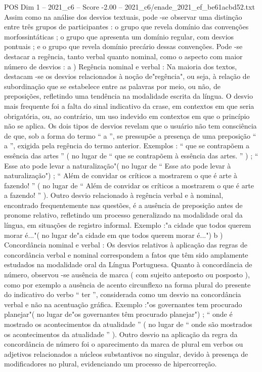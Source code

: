 \begin{textsample}{POS Dim 1 – 2021\_c6 – Score -2.00 – 2021\_c6/enade\_2021\_ef\_be61acbd52.txt}
Assim como na análise dos desvios textuais, pode -se observar uma distinção entre três grupos de participantes : o grupo que revela domínio das convenções morfossintáticas ; o grupo que apresenta um domínio regular, com desvios pontuais ; e o grupo que revela domínio precário dessas convenções.
Pode -se destacar a regência, tanto verbal quanto nominal, como o aspecto com maior número de desvios : a ) Regência nominal e verbal : Na maioria dos textos, destacam -se os desvios relacionados à noção de"regência", ou seja, à relação de subordinação que se estabelece entre as palavras por meio, ou não, de preposições, refletindo uma tendência na modalidade escrita da língua.
O desvio mais frequente foi a falta do sinal indicativo da crase, em contextos em que seria obrigatória, ou, ao contrário, um uso indevido em contextos em que o princípio não se aplica.
Os dois tipos de desvios revelam que o usuário não tem consciência de que, sob a forma do termo “ a ”, se pressupõe a presença de uma preposição “ a ”, exigida pela regência do termo anterior.
Exemplos : “ que se contrapõem a essência das artes ” ( no lugar de “ que se contrapõem à essência das artes. ” ) ; “ Esse ato pode levar a naturalização"( no lugar de “ Esse ato pode levar à naturalização") ; “ Além de convidar os críticos a mostrarem o que é arte à fazendo! ” ( no lugar de “ Além de convidar os críticos a mostrarem o que é arte a fazendo! ” ).
Outro desvio relacionado à regência verbal e à nominal, encontrado frequentemente nas questões, é a ausência de preposição antes de pronome relativo, refletindo um processo generalizado na modalidade oral da língua, em situações de registro informal.
Exemplo :"a cidade que todos querem morar é..."( no lugar de"a cidade em que todos querem morar é...") b ) Concordância nominal e verbal : Os desvios relativos à aplicação das regras de concordância verbal e nominal correspondem a fatos que têm sido amplamente estudados na modalidade oral da Língua Portuguesa.
Quanto à concordância de número, observou -se ausência de marca ( com sujeito anteposto ou posposto ), como por exemplo a ausência de acento circunflexo na forma plural do presente do indicativo do verbo “ ter ”, considerada como um desvio na concordância verbal e não na acentuação gráfica.
Exemplo :"os governantes tem procurado planejar"( no lugar de"os governantes têm procurado planejar") ; “ onde é mostrado os acontecimentos da atualidade ” ( no lugar de “ onde são mostrados os acontecimentos da atualidade ” ).
Outro desvio na aplicação da regra da concordância de número foi o aparecimento da marca de plural em verbos ou adjetivos relacionados a núcleos substantivos no singular, devido à presença de modificadores no plural, evidenciando um processo de hipercorreção.

\end{textsample}
